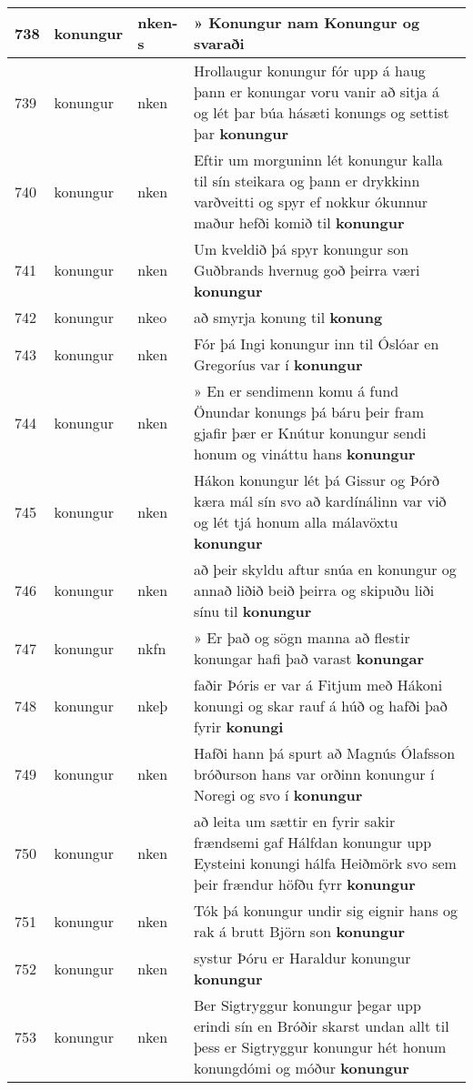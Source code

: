 \documentclass{article}
\begin{document}
\begin{longtable}{p{1cm}|p{1cm}|p{1cm}|p{13cm}}
\hline
738&konungur&nken-s&» Konungur nam \textbf{Konungur} og svaraði\\
\hline
739&konungur&nken&Hrollaugur konungur fór upp á haug þann er konungar voru vanir að sitja á og lét þar búa hásæti konungs og settist þar \textbf{konungur} \\
\hline
740&konungur&nken&Eftir um morguninn lét konungur kalla til sín steikara og þann er drykkinn varðveitti og spyr ef nokkur ókunnur maður hefði komið til \textbf{konungur} \\
\hline
741&konungur&nken&Um kveldið þá spyr konungur son Guðbrands hvernug goð þeirra væri \textbf{konungur} \\
\hline
742&konungur&nkeo&að smyrja konung til \textbf{konung} \\
\hline
743&konungur&nken&Fór þá Ingi konungur inn til Óslóar en Gregoríus var í \textbf{konungur} \\
\hline
744&konungur&nken&» En er sendimenn komu á fund Önundar konungs þá báru þeir fram gjafir þær er Knútur konungur sendi honum og vináttu hans \textbf{konungur} \\
\hline
745&konungur&nken&Hákon konungur lét þá Gissur og Þórð kæra mál sín svo að kardínálinn var við og lét tjá honum alla málavöxtu \textbf{konungur} \\
\hline
746&konungur&nken&að þeir skyldu aftur snúa en konungur og annað liðið beið þeirra og skipuðu liði sínu til \textbf{konungur} \\
\hline
747&konungur&nkfn&» Er það og sögn manna að flestir konungar hafi það varast \textbf{konungar} \\
\hline
748&konungur&nkeþ&faðir Þóris er var á Fitjum með Hákoni konungi og skar rauf á húð og hafði það fyrir \textbf{konungi} \\
\hline
749&konungur&nken&Hafði hann þá spurt að Magnús Ólafsson bróðurson hans var orðinn konungur í Noregi og svo í \textbf{konungur} \\
\hline
750&konungur&nken&að leita um sættir en fyrir sakir frændsemi gaf Hálfdan konungur upp Eysteini konungi hálfa Heiðmörk svo sem þeir frændur höfðu fyrr \textbf{konungur} \\
\hline
751&konungur&nken&Tók þá konungur undir sig eignir hans og rak á brutt Björn son \textbf{konungur} \\
\hline
752&konungur&nken&systur Þóru er Haraldur konungur \textbf{konungur} \\
\hline
753&konungur&nken&Ber Sigtryggur konungur þegar upp erindi sín en Bróðir skarst undan allt til þess er Sigtryggur konungur hét honum konungdómi og móður \textbf{konungur} \\

\end{longtable}
\end{document}
